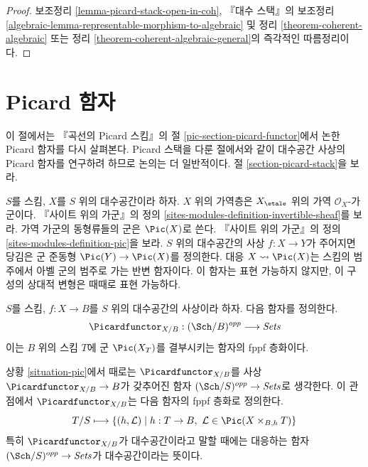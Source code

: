 \begin{proof}
보조정리 \ref{lemma-picard-stack-open-in-coh}, 『대수 스택』의 보조정리
\ref{algebraic-lemma-representable-morphism-to-algebraic}
및 정리 \ref{theorem-coherent-algebraic} 또는 정리
\ref{theorem-coherent-algebraic-general}의 즉각적인 따름정리이다.
\end{proof}








\section{Picard 함자}
\label{section-picard-functor}

\noindent
이 절에서는 『곡선의 Picard 스킴』의 절
\ref{pic-section-picard-functor}에서 논한 Picard 함자를 다시 살펴본다.
Picard 스택을 다룬 절에서와 같이 대수공간 사상의 Picard 함자를 연구하려
하므로 논의는 더 일반적이다. 절 \ref{section-picard-stack}을 보라.

\medskip\noindent
$S$를 스킴, $X$를 $S$ 위의 대수공간이라 하자. $X$ 위의 가역층은
$X_\etale$ 위의 가역 $\mathcal{O}_X$-가군이다. 『사이트 위의 가군』의 정의
\ref{sites-modules-definition-invertible-sheaf}를 보라. 가역 가군의
동형류들의 군은 $\Pic(X)$로 쓴다. 『사이트 위의 가군』의 정의
\ref{sites-modules-definition-pic}을 보라. $S$ 위의 대수공간의 사상
$f : X \to Y$가 주어지면 당김은 군 준동형
$\Pic(Y) \to \Pic(X)$를 정의한다. 대응 $X \leadsto \Pic(X)$는
스킴의 범주에서 아벨 군의 범주로 가는 반변 함자이다. 이 함자는
표현 가능하지 않지만, 이 구성의 상대적 변형은 때때로 표현 가능하다.

\begin{situation}
\label{situation-pic}
$S$를 스킴, $f : X \to B$를 $S$ 위의 대수공간의 사상이라 하자.
다음 함자를 정의한다.
$$
\Picardfunctor_{X/B} : (\Sch/B)^{opp} \longrightarrow \textit{Sets}
$$
이는 $B$ 위의 스킴 $T$에 군 $\Pic(X_T)$를 결부시키는 함자의
fppf 층화이다.
\end{situation}

\noindent
상황 \ref{situation-pic}에서 때로는 $\Picardfunctor_{X/B}$를 사상
$\Picardfunctor_{X/B} \to B$가 갖추어진 함자
$(\Sch/S)^{opp} \to \textit{Sets}$로 생각한다. 이 관점에서
$\Picardfunctor_{X/B}$는 다음 함자의 fppf 층화로 정의한다.
$$
T/S \longmapsto \{(h, \mathcal{L}) \mid
h : T \to B,\ \mathcal{L} \in \Pic(X \times_{B, h} T)\}
$$
특히 $\Picardfunctor_{X/B}$가 대수공간이라고 말할 때에는 대응하는 함자
$(\Sch/S)^{opp} \to \textit{Sets}$가 대수공간이라는 뜻이다.

